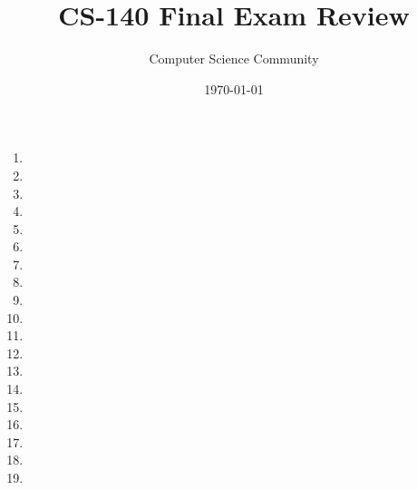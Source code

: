 \documentclass[11pt]{article}
\author{Computer Science Community}
\title{CS-140 Final Exam Review}
\date{\today}
\begin{document}
\header

\begin{enumerate}
\pagebreak
\item 

\item 

\item 

\item 

\pagebreak
\item 

\item 

\pagebreak
\item 
\vspace{1in}

\newpage
\item 

\item 

\item 

\item 

\item 

\item 

\item 

\item 

\item 

\item 

\item 

\item 


\end{enumerate}
\end{document}
